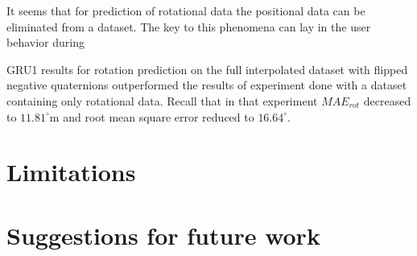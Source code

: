 It seems that for  prediction of rotational data the positional data can be eliminated from a dataset. The key to this phenomena can lay in the user behavior during 


GRU1 results for rotation prediction on the full interpolated dataset with flipped negative quaternions outperformed the results of experiment done with a dataset containing only rotational data. Recall that in that experiment $MAE_{rot}$ decreased to $11.81^{\circ}$m and root mean square error reduced to  $16.64^{\circ}$.


\section{Limitations}
\label{sec:conclusion:limitations}

\section{Suggestions for future work}
\label{sec:conclusion:future}

